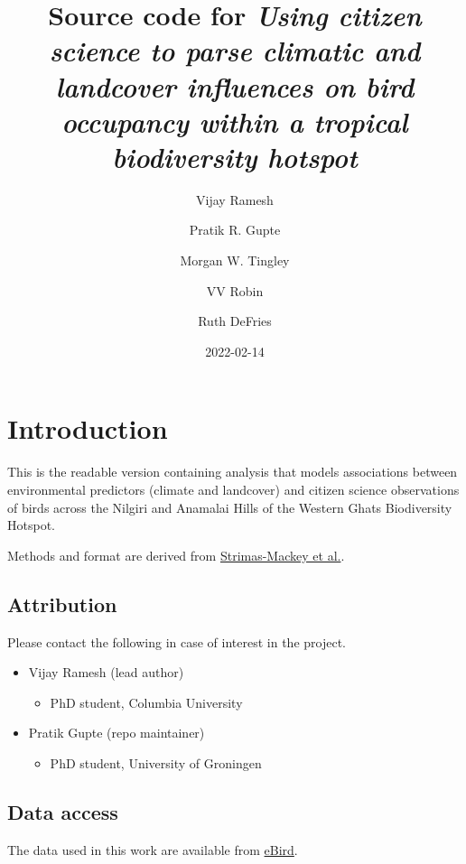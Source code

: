 \documentclass[
]{article}
\title{Source code for \emph{Using citizen science to parse climatic and landcover influences on bird occupancy within a tropical biodiversity hotspot}}
\author{Vijay Ramesh \and Pratik R. Gupte \and Morgan W. Tingley \and VV Robin \and Ruth DeFries}
\date{2022-02-14}
\providecommand{\tightlist}{%
  \setlength{\itemsep}{0pt}\setlength{\parskip}{0pt}}
\begin{document}
\maketitle

{
\setcounter{tocdepth}{2}
\tableofcontents
}
\hypertarget{introduction}{%
\section{Introduction}\label{introduction}}

This is the readable version containing analysis that models associations between environmental predictors (climate and landcover) and citizen science observations of birds across the Nilgiri and Anamalai Hills of the Western Ghats Biodiversity Hotspot.

Methods and format are derived from \href{https://cornelllabofornithology.github.io/ebird-best-practices/}{Strimas-Mackey et al.}.

\hypertarget{attribution}{%
\subsection{Attribution}\label{attribution}}

Please contact the following in case of interest in the project.

\begin{itemize}
\tightlist
\item
  Vijay Ramesh (lead author)

  \begin{itemize}
  \tightlist
  \item
    PhD student, Columbia University
  \end{itemize}
\item
  Pratik Gupte (repo maintainer)

  \begin{itemize}
  \tightlist
  \item
    PhD student, University of Groningen
  \end{itemize}
\end{itemize}

\hypertarget{data-access}{%
\subsection{Data access}\label{data-access}}

The data used in this work are available from \href{http://ebird.org/data/download}{eBird}.
\end{document}
